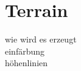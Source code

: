 \section{Terrain}
\begin{Spacing}{\mylinespace}

wie wird es erzeugt \\
einfärbung\\
höhenlinien\\


\end{Spacing}
\newpage
\clearpage
